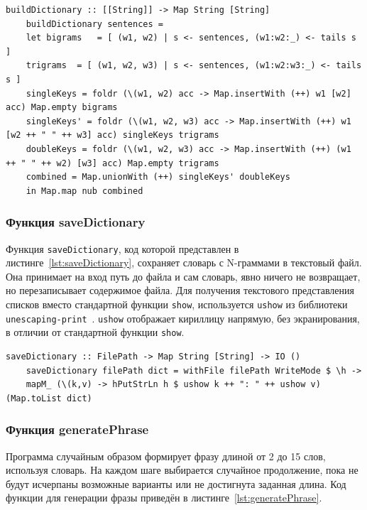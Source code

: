 \documentclass[a4paper, final]{article}
\begin{document}
\begin{lstlisting}[caption={Функция buildDictionary для формирования словаря N-грамм}, label={lst:buildDictionary}]
	buildDictionary :: [[String]] -> Map String [String]
	buildDictionary sentences =
	let bigrams   = [ (w1, w2) | s <- sentences, (w1:w2:_) <- tails s ]
	trigrams  = [ (w1, w2, w3) | s <- sentences, (w1:w2:w3:_) <- tails s ]
	singleKeys = foldr (\(w1, w2) acc -> Map.insertWith (++) w1 [w2] acc) Map.empty bigrams
	singleKeys' = foldr (\(w1, w2, w3) acc -> Map.insertWith (++) w1 [w2 ++ " " ++ w3] acc) singleKeys trigrams
	doubleKeys = foldr (\(w1, w2, w3) acc -> Map.insertWith (++) (w1 ++ " " ++ w2) [w3] acc) Map.empty trigrams
	combined = Map.unionWith (++) singleKeys' doubleKeys
	in Map.map nub combined
\end{lstlisting}

\subsubsection{Функция saveDictionary}
Функция \texttt{saveDictionary}, код которой представлен в листинге~\ref{lst:saveDictionary}, сохраняет словарь с N-граммами в текстовый файл. Она принимает на вход путь до файла и сам словарь, явно ничего не возвращает, но перезаписывает содержимое файла. Для получения текстового представления списков вместо стандартной функции \texttt{show}, используется \texttt{ushow} из библиотеки \texttt{unescaping-print}~\cite{unescaping-print}. \texttt{ushow} отображает кириллицу напрямую, без экранирования, в отличии от стандартной функции \texttt{show}.

\begin{lstlisting}[caption={Функция saveDictionary для сохранения словаря N-грамм в файл.}, label={lst:saveDictionary}]
	saveDictionary :: FilePath -> Map String [String] -> IO ()
	saveDictionary filePath dict = withFile filePath WriteMode $ \h -> 
	mapM_ (\(k,v) -> hPutStrLn h $ ushow k ++ ": " ++ ushow v) (Map.toList dict)
\end{lstlisting}

\subsubsection{Функция generatePhrase}

Программа случайным образом формирует фразу длиной от 2 до 15 слов, используя словарь. На каждом шаге выбирается случайное продолжение, пока не будут исчерпаны возможные варианты или не достигнута заданная длина. Код функции для генерации фразы приведён в листинге~\ref{lst:generatePhrase}.
\end{document}
